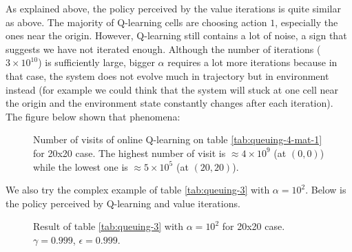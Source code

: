 \documentclass[
  a4paper, xcolor = usenames,dvipsnames]{article}
\theoremstyle{definition}
\theoremstyle{definition}
\theoremstyle{definition}
\theoremstyle{definition}
\theoremstyle{remark}
\begin{document}
As explained above, the policy perceived by the value iterations is quite similar as above. The majority of Q-learning cells are choosing action \(1\), especially the ones near the origin. However, Q-learning still contains a lot of noise, a sign that suggests we have not iterated enough. Although the number of iterations (\(3 \times 10^{10}\)) is sufficiently large, bigger \(\alpha\) requires a lot more iterations because in that case, the system does not evolve much in trajectory but in environment instead (for example we could think that the system will stuck at one cell near the origin and the environment state constantly changes after each iteration). The figure below shown that phenomena:



\begin{figure}

{\centering {}

}

\caption{Number of visits of online Q-learning on table \ref{tab:queuing-4-mat-1} for 20x20 case. The highest number of visit is \(\approx 4 \times 10^{9}\) (at \((0, 0)\)) while the lowest one is \(\approx 5 \times 10^5\) (at \((20, 20)\)).}\label{fig:20x20-queuing-4-n-visit}
\end{figure}

We also try the complex example of table \ref{tab:queuing-3} with \(\alpha = 10^{2}\). Below is the policy perceived by Q-learning and value iterations.



\begin{figure}

{\centering {}

}

\caption{Result of table \ref{tab:queuing-3} with \(\alpha = 10^{2}\) for 20x20 case. \(\gamma = 0.999\), \(\epsilon = 0.999\).}\label{fig:20x20-queuing-5}
\end{figure}
\end{document}
